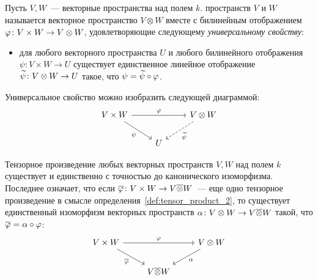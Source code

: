 \begin{definition}\label{def:tensor_product_2}
Пусть $V,W$~--- векторные пространства над полем $k$. 
пространств $V$ и $W$ называется векторное пространство $V\otimes W$
вместе с билинейным отображением $\varphi\colon V\times W\to V\otimes W$,
удовлетворяющие следующему {\em универсальному свойству}:
\begin{itemize}
\item для любого векторного пространства $U$ и любого билинейного
  отображения $\psi\colon V\times W\to U$ существует единственное
  линейное отображение $\widetilde\psi\colon V\otimes W\to U$ такое, что
  $\psi = \widetilde\psi\circ\varphi$.
\end{itemize}
\end{definition}
Универсальное свойство можно изобразить следующей диаграммой:
$$
\begin{tikzcd}
V\times W\arrow{rr}{\ph}\arrow{rd}[swap]{\psi} &
& V\otimes W\arrow[dashed]{dl}{\tld\psi} \\
& U
\end{tikzcd}
$$
\begin{theorem}\label{thm:tensor_product}
Тензорное произведение любых векторных пространств $V,W$ над полем $k$
существует и единственно с точностью до канонического
изоморфизма. Последнее означает, что если $\overline{\varphi}\colon V\times W\to
V\overline\otimes W$~--- еще одно тензорное произведение в смысле
определения~\ref{def:tensor_product_2}, то существует единственный
изоморфизм векторных пространств $\alpha\colon V\otimes W\to
V\overline\otimes W$ такой, что $\overline{\varphi} = \alpha\circ\varphi$:
$$
\begin{tikzcd}
V\times W \arrow{rr}{\ph} \arrow{dr}[swap]{\ol\ph}
& & V\otimes W \arrow{dl}{\alpha} \\
& V\ol\otimes W
\end{tikzcd}
$$
\end{theorem}
